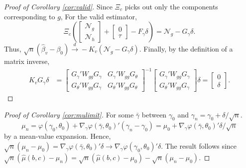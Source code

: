 \begin{proof}[Proof of Corollary \ref{cor:valid}]
Since $\Xi_c$ picks out only the components corresponding to $g$,
For the valid estimator,
	$$\Xi_c \left(\left[\begin{array}{c} \mathscr{N}_g\\  \mathscr{N}_h\end{array}\right]+ \left[ \begin{array}{c} 0\\ \tau\end{array}\right] - F_\gamma\delta\right) =  \mathscr{N}_g - G_\gamma \delta.$$
Thus, $\sqrt{n}\left( \widehat{\beta}_v - \beta_0 \right) \overset{d}{\rightarrow} -K_v\left(\mathscr{N}_g - G_\gamma \delta\right)$.
Finally, by the definition of a matrix inverse,
	\begin{align*}
		K_v G_\gamma \delta
			&= \left[\begin{array}{cc} 
				G_\gamma'W_{gg}G_\gamma & G_\gamma'W_{gg}G_\theta\\
				G_\theta'W_{gg}G_\gamma & G_\theta'W_{gg}G_\theta
			\end{array} \right]^{-1}
			\left[\begin{array}{c}
				G_\gamma'W_{gg}G_\gamma\\
				G_\theta'W_{gg}G_\gamma
			\end{array}\right]\delta =\left[\begin{array}{c} 0\\ \delta\end{array}\right].
	\end{align*}
\end{proof}


\begin{proof}[Proof of Corollary \ref{cor:mulimit}]
For some $\bar{\gamma}$ between $\gamma_0$ and $\gamma_n = \gamma_0 +\delta/\sqrt{n}$. 
		\[\mu_n  = \varphi(\gamma_0,\theta_0)+ \nabla_\gamma \varphi(\bar{\gamma},\theta_0)'(\gamma_n - \gamma_0) = \mu_0 + \nabla_\gamma \varphi(\bar{\gamma},\theta_0)' \delta/\sqrt{n}\]
by a mean-value expansion.
Hence, $\sqrt{n}(\mu_n - \mu_0) = \nabla_\gamma \varphi(\bar{\gamma},\theta_0)' \delta \rightarrow \nabla_\gamma \varphi(\gamma_0,\theta_0)' \delta$.
The result follows since $\sqrt{n}\left(\widehat{\mu}(b,c) - \mu_n \right)  = \sqrt{n}\left( \widehat{\mu}(b,c) - \mu_0 \right) - \sqrt{n}\left(\mu_n - \mu_0\right)$.
\end{proof}



